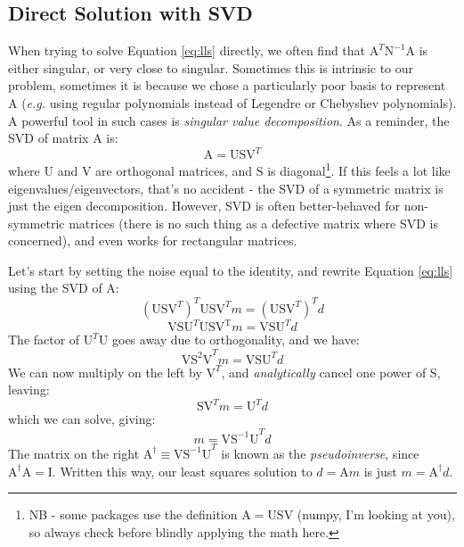 \documentclass[letterpaper,11pt,preprint]{aastex}
\begin{document}
{\subsection{Direct Solution with SVD}
When trying to solve Equation \ref{eq:lls} directly, we often find
that $\mathrm{A}^T \mathrm{N}^{-1} \mathrm{A}$ is either singular, or
very close to singular.  Sometimes this is intrinsic to our problem,
sometimes it is because we chose a particularly poor basis to
represent $\mathrm{A}$ (\textit{e.g.} using regular polynomials
instead of Legendre or Chebyshev polynomials).  A powerful tool in
such cases is \textit{singular value decomposition}.  As a reminder,
the SVD of matrix $\mathrm{A}$ is:
$$\mathrm{A}=\mathrm{USV}^T$$
where $\mathrm{U}$ and $\mathrm{V}$ are orthogonal matrices, and
$\mathrm{S}$ is diagonal\footnote{NB - some packages use the
  definition $\mathrm{A}=\mathrm{USV}$ (numpy, I'm looking at you), so
  always check before blindly applying the math here.}.  If this feels a lot like
eigenvalues/eigenvectors, that's no accident - the SVD of a symmetric
matrix is just the eigen decomposition.  However, SVD is often
better-behaved for non-symmetric matrices (there is no such thing as a
defective matrix where SVD is concerned), and even works for
rectangular matrices.  

Let's start by setting the noise equal to the identity, and rewrite
Equation \ref{eq:lls} using the SVD of $\mathrm{A}$:
$$(\mathrm{USV}^T)^T\mathrm{USV}^Tm=(\mathrm{USV}^T)^Td$$
$$\mathrm{VSU}^T\mathrm{USV^T}m=\mathrm{VSU}^Td$$
The factor of $\mathrm{U}^T\mathrm{U}$ goes away due to orthogonality,
and we have:
$$\mathrm{VS^2V}^Tm=\mathrm{VSU}^Td$$
We can now multiply on the left by $\mathrm{V}^T$, and
\textit{analytically} cancel one power of $\mathrm{S}$, leaving:
$$\mathrm{SV}^Tm=\mathrm{U}^Td$$
which we can solve, giving:
$$m=\mathrm{VS^{-1}U}^Td$$
The matrix on the right $\mathrm{A}^\dag\equiv \mathrm{VS^{-1}U}^T$ is known as the
\textit{pseudoinverse}, since $\mathrm{A^\dag A}=\mathrm{I}$.  Written
this way, our least squares solution to $d=\mathrm{A}m$ is just
$m=\mathrm{A}^\dag d$.  

}
\end{document}
